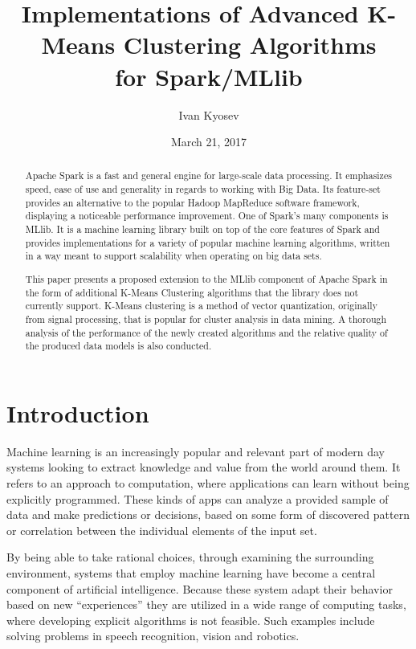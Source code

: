 \documentclass{l4proj}
\begin{document}
\title{Implementations of Advanced K-Means Clustering Algorithms \\ for Spark/MLlib}
\author{Ivan Kyosev}
\date{March 21, 2017}
\maketitle

\begin{abstract}
Apache Spark is a fast and general engine for large-scale data processing. It emphasizes speed, ease of use and generality in regards to working with Big Data. Its feature-set provides an alternative to the popular Hadoop MapReduce software framework, displaying a noticeable performance improvement. One of Spark's many components is MLlib. It is a machine learning library built on top of the core features of Spark and provides implementations for a variety of popular machine learning algorithms, written in a way meant to support scalability when operating on big data sets.

This paper presents a proposed extension to the MLlib component of Apache Spark in the form of additional K-Means Clustering algorithms that the library does not currently support. K-Means clustering is a method of vector quantization, originally from signal processing, that is popular for cluster analysis in data mining. A thorough analysis of the performance of the newly created algorithms and the relative quality of the produced data models is also conducted.
\end{abstract}

\educationalconsent

\tableofcontents

\chapter{Introduction}
\label{intro}

Machine learning is an increasingly popular and relevant part of modern day systems looking to extract knowledge and value from the world around them. It refers to an approach to computation, where applications can learn without being explicitly programmed. These kinds of apps can analyze a provided sample of data and make predictions or decisions, based on some form of discovered pattern or correlation between the individual elements of the input set.

By being able to take rational choices, through examining the surrounding environment, systems that employ machine learning have become a central component of artificial intelligence. Because these system adapt their behavior based on new ``experiences'' they are utilized in a wide range of computing tasks, where developing explicit algorithms is not feasible. Such examples include solving problems in speech recognition, vision and robotics.
\end{document}
